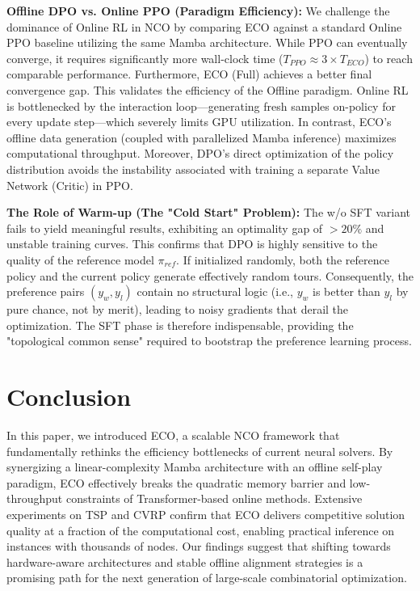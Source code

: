 \documentclass{article}
\theoremstyle{plain}
\theoremstyle{definition}
\theoremstyle{remark}
\begin{document}
\textbf{Offline DPO vs. Online PPO (Paradigm Efficiency):} We challenge the dominance of Online RL in NCO by comparing ECO against a standard Online PPO baseline utilizing the same Mamba architecture. While PPO can eventually converge, it requires significantly more wall-clock time ($T_{PPO} \approx 3 \times T_{ECO}$) to reach comparable performance. Furthermore, ECO (Full) achieves a better final convergence gap. This validates the efficiency of the Offline paradigm. Online RL is bottlenecked by the interaction loop—generating fresh samples on-policy for every update step—which severely limits GPU utilization. In contrast, ECO's offline data generation (coupled with parallelized Mamba inference) maximizes computational throughput. Moreover, DPO's direct optimization of the policy distribution avoids the instability associated with training a separate Value Network (Critic) in PPO.

\textbf{The Role of Warm-up (The "Cold Start" Problem):} The w/o SFT variant fails to yield meaningful results, exhibiting an optimality gap of $>20\%$ and unstable training curves. This confirms that DPO is highly sensitive to the quality of the reference model $\pi_{ref}$. If initialized randomly, both the reference policy and the current policy generate effectively random tours. Consequently, the preference pairs $(y_w, y_l)$ contain no structural logic (i.e., $y_w$ is better than $y_l$ by pure chance, not by merit), leading to noisy gradients that derail the optimization. The SFT phase is therefore indispensable, providing the "topological common sense" required to bootstrap the preference learning process.


\section{Conclusion}

In this paper, we introduced ECO, a scalable NCO framework that fundamentally rethinks the efficiency bottlenecks of current neural solvers. By synergizing a linear-complexity Mamba architecture with an offline self-play paradigm, ECO effectively breaks the quadratic memory barrier and low-throughput constraints of Transformer-based online methods. Extensive experiments on TSP and CVRP confirm that ECO delivers competitive solution quality at a fraction of the computational cost, enabling practical inference on instances with thousands of nodes. Our findings suggest that shifting towards hardware-aware architectures and stable offline alignment strategies is a promising path for the next generation of large-scale combinatorial optimization.
\end{document}
